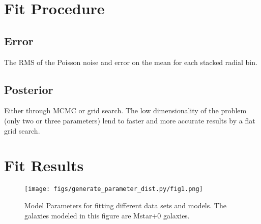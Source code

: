 \documentclass[twocolumn]{article}
\begin{document}
\section{Fit Procedure}

\subsection{Error}
The RMS of the Poisson noise and error on the mean for each stacked radial bin.

\subsection{Posterior}
Either through MCMC or grid search. The low dimensionality of the
problem (only two or three parameters) lend to faster and more
accurate results by a flat grid search. 

\section{Fit Results}
\begin{figure}
  \texttt{[image: figs/generate\_parameter\_dist.py/fig1.png]}
  \caption{Model Parameters for fitting different data sets and
    models. The galaxies modeled in this figure are Mstar+0 galaxies. }
\end{figure}
\twocolumn
\clearpage
\appendix





\end{document}
